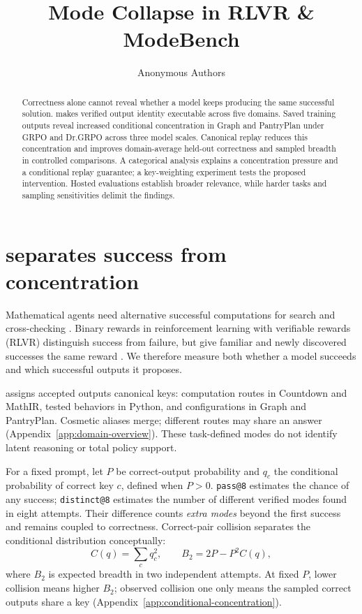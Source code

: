 
\title{Mode Collapse in RLVR \& ModeBench}
\author{Anonymous Authors}

\maketitle

\begin{abstract}
Correctness alone cannot reveal whether a model keeps producing the same
successful solution. \mb{} makes verified output identity executable across
five domains. Saved training outputs reveal increased conditional concentration
in Graph and PantryPlan under GRPO and Dr.GRPO across three model scales.
Canonical replay reduces this concentration and improves domain-average
held-out correctness and sampled breadth in controlled comparisons.
A categorical analysis explains a concentration pressure and a conditional
replay guarantee; a key-weighting experiment tests the proposed intervention.
Hosted evaluations establish broader relevance, while harder tasks and
sampling sensitivities delimit the findings.
\end{abstract}

\section{\mb{} separates success from concentration}
\label{sec:introduction}\label{sec:modebench}
Mathematical agents need alternative successful computations for search and
cross-checking \citep{brown2024monkeys,snell2024testtime}. Binary rewards in
reinforcement learning with verifiable rewards (RLVR) distinguish success
from failure, but give familiar and newly discovered successes the same reward
\citep{guo2025deepseekr1}. We therefore measure both whether a model succeeds
and which successful outputs it proposes.

\href{https://huggingface.co/datasets/od2961/ModeBench}{\mb{}} assigns accepted
outputs canonical keys: computation routes in Countdown and MathIR, tested
behaviors in Python, and configurations in Graph and PantryPlan.
Cosmetic aliases merge; different routes may share an answer
(Appendix~\ref{app:domain-overview}). These task-defined modes do not identify
latent reasoning or total policy support.

For a fixed prompt, let $P$ be correct-output probability and $q_c$ the
conditional probability of correct key $c$, defined when $P>0$.
\texttt{pass@8} estimates the chance of any success; \texttt{distinct@8}
estimates the number of different verified modes found in eight attempts.
Their difference counts \emph{extra modes} beyond the first success and
remains coupled to correctness. Correct-pair collision separates the
conditional distribution conceptually:
\begin{equation}
 C(q)=\sum_c q_c^2,\qquad B_2=2P-P^2C(q),
 \label{eq:workshop-collision-bridge}
\end{equation}
where $B_2$ is expected breadth in two independent attempts.
At fixed $P$, lower collision means higher $B_2$; observed collision one
only means the sampled correct outputs share a key
(Appendix~\ref{app:conditional-concentration}).

